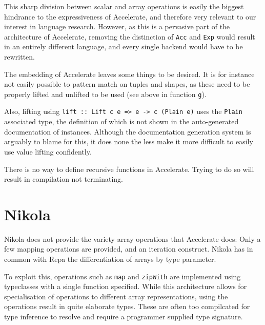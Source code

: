 
This sharp division between scalar and array operations is easily the biggest
hindrance to the expressiveness of Accelerate, and therefore very relevant to
our interest in language research. However, as this is a pervasive part of the
architecture of Accelerate, removing the distinction of \texttt{Acc} and
\texttt{Exp} would result in an entirely different language, and every single
backend would have to be rewritten.


The embedding of Accelerate leaves some things to be desired. It is for
instance not easily possible to pattern match on tuples and shapes, as these
need to be properly lifted and unlifted to be used (see above in function \texttt{g}).

Also, lifting using \texttt{lift :: Lift c e => e -> c (Plain e)} uses the
\texttt{Plain} associated type, the definition of which is not shown in the
auto-generated documentation of instances. Although the documentation
generation system is arguably to blame for this, it does none the less make it
more difficult to easily use value lifting confidently.

There is no way to define recursive functions in Accelerate. Trying to do so
will result in compilation not terminating.

\section{Nikola}

Nikola does not provide the variety array operations that Accelerate does: Only
a few mapping operations are provided, and an iteration construct.  Nikola has
in common with Repa the differentiation of arrays by type parameter.

To exploit this, operations such as \texttt{map} and \texttt{zipWith} are
implemented using typeclasses with a single function specified.  While this
architecture allows for specialisation of operations to different array
representations, using the operations result in quite elaborate types. These
are often too compilcated for type inference to resolve and require a
programmer supplied type signature.

